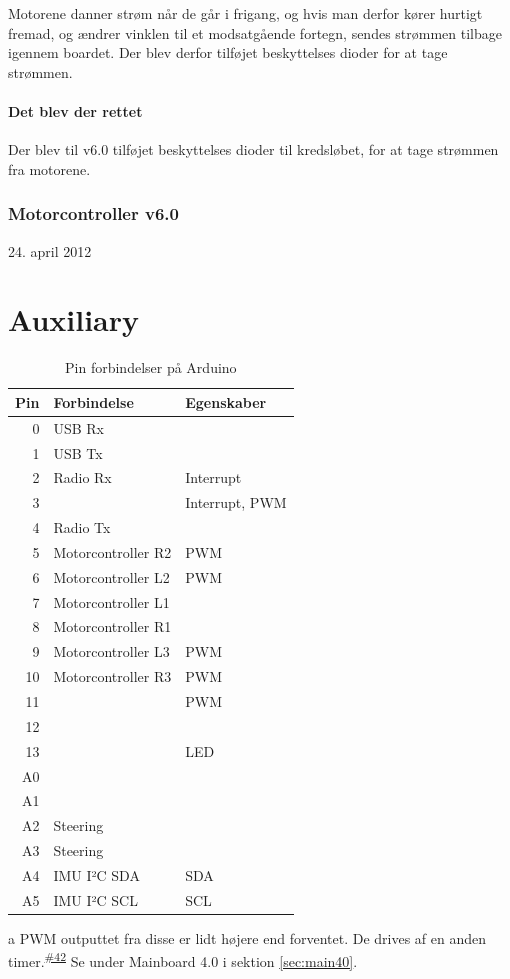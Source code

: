\documentclass[a4paper,oneside,article,danish,table]{memoir}
\newcommand{\boarddate}[1]{\textcolor{blue!80!black}{#1}}
\newcommand{\issue}[1]{\textsuperscript{\textcolor{blue!80!black}{\href{https://github.com/neic/Swagway/issues/#1}{\##1}}}}
\begin{document}
Motorene danner strøm når de går i frigang, og hvis man derfor kører hurtigt fremad, og ændrer vinklen til et modsatgående fortegn, sendes strømmen tilbage igennem boardet. Der blev derfor tilføjet beskyttelses dioder for at tage strømmen.
\subsubsection{Det blev der rettet}
Der blev til v6.0 tilføjet beskyttelses dioder til kredsløbet, for at tage strømmen fra motorene.
\subsection{Motorcontroller v6.0}
\boarddate{24. april 2012}

\chapter{Auxiliary}
\begin{table}[htbp]
  \caption{Pin forbindelser på Arduino}
  \centering
  \begin{threeparttable}
    \begin{tabular}{rll}
      \toprule
      Pin & Forbindelse & Egenskaber\\
      \midrule
      0 & USB Rx & \\
      1 & USB Tx & \\
      2 & Radio Rx & Interrupt\\
      3 & & Interrupt, PWM\\
      4 & Radio Tx & \\
      5 & Motorcontroller R2 & PWM\tnote{a}\\
      6 & Motorcontroller L2 & PWM\tnote{a}\\
      7 & Motorcontroller L1 & \\
      8 & Motorcontroller R1 & \\
      9 & Motorcontroller L3 & PWM\\
      10 & Motorcontroller R3 & PWM\\
      11 & & PWM\\
      12 & & \\
      13 & & LED\\
      A0 & & \\
      A1 & & \\
      A2 & Steering & \\
      A3 & Steering & \\
      A4 & IMU I²C SDA & SDA\\
      A5 & IMU I²C SCL & SCL
    \end{tabular}
    \begin{tablenotes}
      \item[a]{PWM outputtet fra disse er lidt højere end forventet. De drives af en anden timer.\issue{42} Se under Mainboard 4.0 i sektion \ref{sec:main40}.}
    \end{tablenotes}
  \end{threeparttable}
\end{table}
\end{document}
